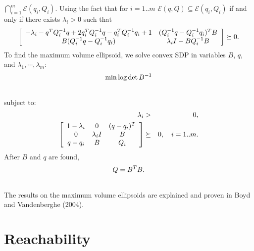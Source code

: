 \documentclass[letterpaper,10pt,english]{sphinxmanual}
\begin{document}
$\bigcap_{i=1}^m{\mathcal E}(q_i,Q_i)$. Using the fact that for
$i=1..m$ ${\mathcal E}(q,Q)\subseteq{\mathcal E}(q_i,Q_i)$
if and only if there exists $\lambda_i>0$ such that
\begin{gather}
\begin{split}\left[\begin{array}{cc}
-\lambda_i - q^TQ_i^{-1}q + 2q_i^TQ_i^{-1}q - q_i^TQ_i^{-1}q_i + 1 & (Q_i^{-1}q-Q_i^{-1}q_i)^TB\\
B(Q_i^{-1}q-Q_i^{-1}q_i) & \lambda_iI-BQ_i^{-1}B\end{array}\right] \succeq 0.\end{split}\notag
\end{gather}
To find the maximum volume ellipsoid, we solve convex SDP in variables
$B$, $q$, and $\lambda_1,\cdots,\lambda_m$:
\begin{gather}
\begin{split}\min \log \det B^{-1}\end{split}\notag\\\begin{split}\end{split}\notag
\end{gather}
subject to:
\begin{gather}
\begin{split}\begin{aligned}
\lambda_i & > & 0, \\
\left[\begin{array}{ccc}
1-\lambda_i & 0 & (q - q_i)^T\\
0 & \lambda_iI & B\\
q - q_i & B & Q_i\end{array}\right] & \succeq & 0, ~~~ i=1..m.\end{aligned}\end{split}\notag
\end{gather}
After $B$ and $q$ are found,
\begin{gather}
\begin{split}Q = B^TB.\end{split}\notag\\\begin{split}\end{split}\notag
\end{gather}
The results on the maximum volume ellipsoids are explained and proven in
Boyd and Vandenberghe (2004).


\chapter{Reachability}
\label{chap_reach:reachability}\label{chap_reach::doc}
\end{document}
